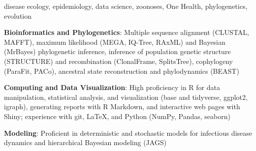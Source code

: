 \documentclass{cv}
\begin{document}
disease ecology, epidemiology, data science, zoonoses, One Health, phylogenetics, evolution


\textbf{Bioinformatics and Phylogenetics}: Multiple sequence alignment (CLUSTAL, MAFFT), maximum likelihood (MEGA, IQ-Tree, RAxML) and Bayesian (MrBayes) phylogenetic inference, inference of population genetic structure (STRUCTURE) and recombination (ClonalFrame, SplitsTree), cophylogeny (ParaFit, PACo), ancestral state reconstruction and phylodynamics (BEAST)

\textbf{Computing and Data Visualization}: High proficiency in R for data manipulation, statistical analysis, and visualization (base and tidyverse, ggplot2, igraph), generating reports with R Markdown, and interactive web pages with Shiny; experience with git, \LaTeX, and Python (NumPy, Pandas, seaborn)

\textbf{Modeling}: Proficient in deterministic and stochastic models for infectious disease dynamics and hierarchical Bayesian modeling (JAGS)
\end{document}
